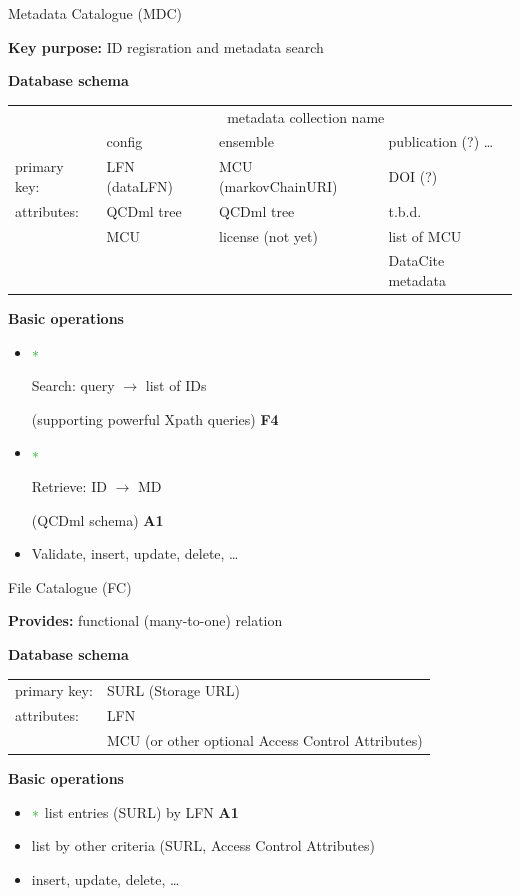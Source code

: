 \documentclass[aspectratio=169,xcolor=dvipsnames]{beamer}
\newcommand{\green}{\color{g3}}
\newcommand{\bi}{\begin{itemize}}
\newcommand{\ei}{\end{itemize}}
\begin{document}
\begin{frame}{Metadata Catalogue (MDC)}

  {\bf Key purpose:} ID regisration and metadata search
  \begin{center}
  \end{center}
  
  {\bf Database schema}
  \begin{center}
    {\small
      \begin{tabular}{l|l|l|l}
                      & \multicolumn{3}{c}{metadata collection name} \\
                      & config         & ensemble             & publication (?) \ldots\\
        \hline 
        primary key:  & LFN (dataLFN)  & MCU (markovChainURI) & DOI (?)    \\
        attributes:   & QCDml tree     & QCDml tree           & t.b.d.     \\
                      & MCU            & license (not yet)    & list of MCU \\
                      &                &                      & DataCite metadata
      \end{tabular}
    }
  \end{center}
  
  {\bf Basic operations}
  \bi
  \item[$\green\ast$] \parbox{14em}{\green Search: query $\to$ list of IDs} (supporting powerful Xpath queries)  \hfill {\bf F4}
  \item[$\green\ast$] \parbox{14em}{\green Retrieve: ID $\to$ MD} (QCDml schema)                                 \hfill {\bf A1}
  \item Validate, insert, update, delete, \ldots
  \ei
  
\end{frame}
\begin{frame}{File Catalogue (FC)}

  {\bf Provides:} functional (many-to-one) relation 
  \begin{center}
  \end{center}
  
  {\bf Database schema}
  \begin{center}
    \begin{tabular}{ll}
      primary key: & SURL (Storage URL)\\
      attributes:  & LFN  \\
      & MCU  {\small (or other optional Access Control Attributes)}
    \end{tabular}
  \end{center}
  
  {\bf Basic operations}
  \bi
  \item[$\green\ast$] {\green list entries (SURL) by LFN}          \hfill {\bf A1}
  \item list by other criteria (SURL, Access Control Attributes)
  \item insert, update, delete, \ldots
  \ei

\end{frame}
\end{document}
